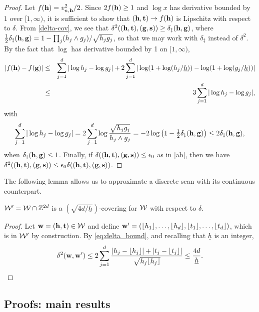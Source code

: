 \documentclass[twoside,11pt]{article}
\begin{document}
\begin{proof}
Let $f(\mathbf{h}) = v_{n,\mathbf{h}}^2/2$.  Since $2 f(\mathbf{h}) \ge 1$ and $\log x$ has derivative bounded by $1$ over $[1,\infty)$, it is sufficient to show that $(\mathbf{h},\mathbf{t}) \to f(\mathbf{h})$ is Lipschitz with respect to $\delta$.
From \eqref{delta-cov}, we see that 
$\delta^2 ((\mathbf{h}, \mathbf{t}), (\mathbf{g}, \mathbf{s})) \ge \delta_\ddag(\mathbf{h}, \mathbf{g})$, where 
$\frac12 \delta_\ddag(\mathbf{h}, \mathbf{g}) = 1 - \prod_j (h_j \wedge g_j)/\sqrt{h_j g_j}$, so that we may work with $\delta_\ddag$ instead of $\delta^2$.
By the fact that $\log$ has derivative bounded by 1 on $[1,\infty)$, 
\begin{eqnarray*}
|f(\mathbf{h}) - f(\mathbf{g})| 
&\le& \sum_{j = 1}^d |\log h_j - \log g_j | + 2 \sum_{j = 1}^d |\log (1 + \log (h_j / \underline h)) - \log (1 + \log (g_j/\underline h)) | \\
&\le& 3 \sum_{j = 1}^d |\log h_j - \log g_j |,
\end{eqnarray*}
with
\[ \sum_{j = 1}^d |\log h_j - \log g_j | = 2 \sum_{j=1}^d \log \frac{\sqrt{h_j g_j}}{h_j \wedge g_j} = -2 \log \big(1-\tfrac12 \delta_\ddag(\mathbf{h}, \mathbf{g})\big) \le 2 \delta_\ddag(\mathbf{h}, \mathbf{g}), \]
when $\delta_\ddag(\mathbf{h}, \mathbf{g}) \le 1$.  
Finally, if $\delta((\mathbf{h},\mathbf{t}),(\mathbf{g},\mathbf{s})) \le \epsilon_0$ as in \eqref{ab}, then we have $\delta^2((\mathbf{h},\mathbf{t}),(\mathbf{g},\mathbf{s})) \le \epsilon_0 \delta((\mathbf{h},\mathbf{t}),(\mathbf{g},\mathbf{s}))$.
\end{proof}

The following lemma allows us to approximate a discrete scan with its continuous counterpart.

\begin{lemma}
\label{lem:Z_epsnet}
$\mathcal{W}' = \mathcal{W} \cap \mathbb{Z}^{2d}$ is a $(\sqrt{4d/\underline h})$-covering for $\mathcal{W}$ with respect to $\delta$.
\end{lemma}

\begin{proof}
Let $\mathbf{w} = (\mathbf{h},\mathbf{t}) \in \mathcal{W}$ and define $\mathbf{w}' = (\lfloor h_1 \rfloor, \ldots, \lfloor h_d \rfloor, \lfloor t_1 \rfloor, \ldots, \lfloor t_d \rfloor)$, which is in $\mathcal{W}'$ by construction.  By \eqref{eq:delta_bound}, and recalling that $\underline h$ is an integer,
\[
\delta^2 (\mathbf{w},\mathbf{w}') \le 2 \sum_{j = 1}^d \frac{|h_j - \lfloor h_j \rfloor| + |t_j - \lfloor t_j \rfloor|}{\sqrt{h_j \lfloor h_j \rfloor}} \le \frac{4 d}{\underline h}. 
\]
\end{proof}


\subsection{Proofs: main results}
\end{document}
